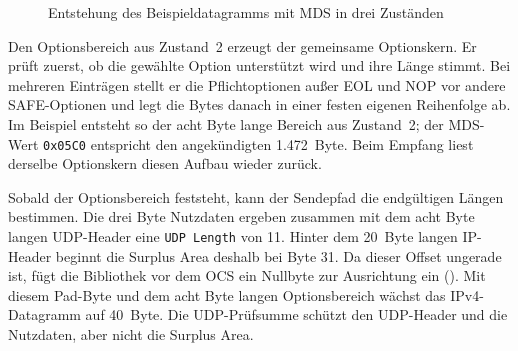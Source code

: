 \begin{figure}[H]
  \caption{Entstehung des Beispieldatagramms mit MDS in drei Zuständen}
  \label{fig:paketentstehung}
\end{figure}

Den Optionsbereich aus Zustand~2 erzeugt der gemeinsame Optionskern. Er prüft zuerst, ob die gewählte
Option unterstützt wird und ihre Länge stimmt. Bei mehreren Einträgen stellt er die Pflichtoptionen außer EOL
und NOP vor andere SAFE-Optionen \cite[Sec.~10]{rfc9868} und legt die Bytes danach in einer festen
eigenen Reihenfolge ab. Im Beispiel entsteht so der acht Byte lange Bereich aus Zustand~2; der MDS-Wert
\texttt{0x05C0} entspricht den angekündigten 1.472~Byte. Beim Empfang liest derselbe Optionskern diesen
Aufbau wieder zurück.

Sobald der Optionsbereich feststeht, kann der Sendepfad die endgültigen Längen bestimmen. Die drei
Byte Nutzdaten ergeben zusammen mit dem acht Byte langen UDP-Header eine \texttt{UDP Length} von 11.
Hinter dem 20~Byte langen IP-Header beginnt die Surplus Area deshalb bei Byte 31. Da dieser Offset ungerade
ist, fügt die Bibliothek vor dem OCS ein Nullbyte zur Ausrichtung ein
(). Mit diesem Pad-Byte und dem acht Byte langen Optionsbereich wächst das
IPv4-Datagramm auf 40~Byte. Die UDP-Prüfsumme schützt den UDP-Header und die Nutzdaten, aber nicht die
Surplus Area.

